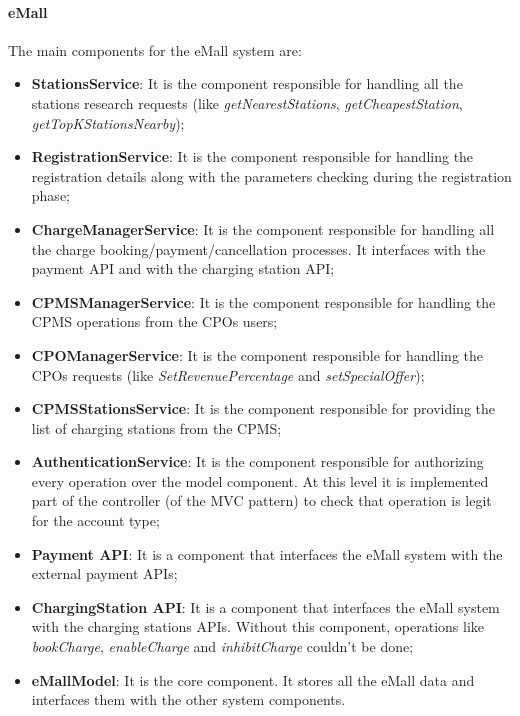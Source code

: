 \paragraph{\textbf{\ac{eMall}}}
The main components for the \ac{eMall} system are:
\begin{itemize}
    \item \textbf{StationsService}: It is the component responsible for handling all the stations research requests (like \textit{getNearestStations}, \textit{getCheapestStation}, \textit{getTopKStationsNearby});
    \item \textbf{RegistrationService}: It is the component responsible for handling the registration details along with the parameters checking during the registration phase;
    \item \textbf{ChargeManagerService}: It is the component responsible for handling all the charge booking/payment/cancellation processes. It interfaces with the payment \ac{API} and with the charging station \ac{API};
    \item \textbf{\ac{CPMS}ManagerService}: It is the component responsible for handling the \ac{CPMS} operations from the \acp{CPO} users;
    \item \textbf{\ac{CPO}ManagerService}: It is the component responsible for handling the \acp{CPO} requests (like \textit{SetRevenuePercentage} and \textit{setSpecialOffer});
    \item \textbf{\ac{CPMS}StationsService}: It is the component responsible for providing the list of charging stations from the \ac{CPMS};
    \item \textbf{AuthenticationService}: It is the component responsible for authorizing every operation over the model component. At this level it is implemented part of the controller (of the \ac{MVC} pattern) to check that operation is legit for the account type;
    \item \textbf{Payment \ac{API}}: It is a component that interfaces the \ac{eMall} system with the external payment \acp{API};
    \item \textbf{ChargingStation \ac{API}}: It is a component that interfaces the \ac{eMall} system with the charging stations \acp{API}. Without this component, operations like \textit{bookCharge}, \textit{enableCharge} and \textit{inhibitCharge} couldn't be done;
    \item \textbf{\ac{eMall}Model}: It is the core component. It stores all the \ac{eMall} data and interfaces them with the other system components.
\end{itemize}
